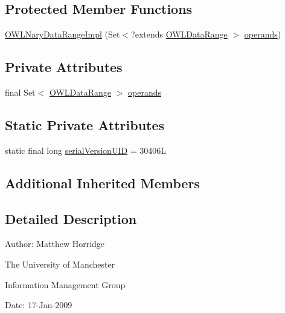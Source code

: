 \subsection*{Protected Member Functions}
\begin{DoxyCompactItemize}
\item 
\hyperlink{classuk_1_1ac_1_1manchester_1_1cs_1_1owl_1_1owlapi_1_1_o_w_l_nary_data_range_impl_a8dbf1b9e1d4abc6624af91af36b3b525}{O\-W\-L\-Nary\-Data\-Range\-Impl} (Set$<$?extends \hyperlink{interfaceorg_1_1semanticweb_1_1owlapi_1_1model_1_1_o_w_l_data_range}{O\-W\-L\-Data\-Range} $>$ \hyperlink{classuk_1_1ac_1_1manchester_1_1cs_1_1owl_1_1owlapi_1_1_o_w_l_nary_data_range_impl_a4536392a3f3322085f03875bc3ac1ef1}{operands})
\end{DoxyCompactItemize}
\subsection*{Private Attributes}
\begin{DoxyCompactItemize}
\item 
final Set$<$ \hyperlink{interfaceorg_1_1semanticweb_1_1owlapi_1_1model_1_1_o_w_l_data_range}{O\-W\-L\-Data\-Range} $>$ \hyperlink{classuk_1_1ac_1_1manchester_1_1cs_1_1owl_1_1owlapi_1_1_o_w_l_nary_data_range_impl_a4536392a3f3322085f03875bc3ac1ef1}{operands}
\end{DoxyCompactItemize}
\subsection*{Static Private Attributes}
\begin{DoxyCompactItemize}
\item 
static final long \hyperlink{classuk_1_1ac_1_1manchester_1_1cs_1_1owl_1_1owlapi_1_1_o_w_l_nary_data_range_impl_adf263be401e7e99a553ccb0cb28418ea}{serial\-Version\-U\-I\-D} = 30406\-L
\end{DoxyCompactItemize}
\subsection*{Additional Inherited Members}


\subsection{Detailed Description}
Author\-: Matthew Horridge\par
 The University of Manchester\par
 Information Management Group\par
 Date\-: 17-\/\-Jan-\/2009 

